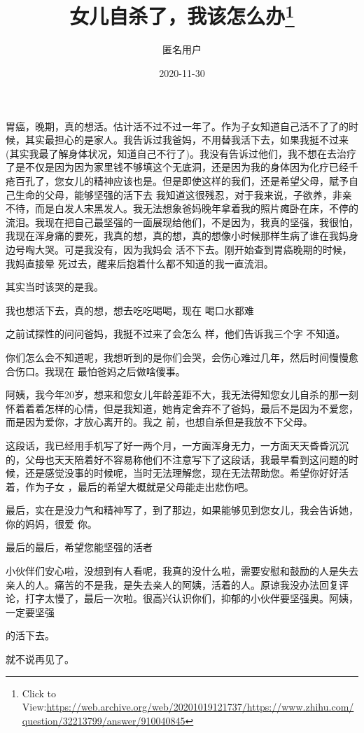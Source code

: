 \documentclass{article}
\title{女儿自杀了，我该怎么办\footnote{Click to View:\url{https://web.archive.org/web/20201019121737/https://www.zhihu.com/question/32213799/answer/910040845}}}
\author{匿名用户}
\date{2020-11-30}
\begin{document}

\maketitle


\Large

﻿胃癌，晚期，真的想活。估计活不过不过一年了。作为子女知道自己活不了了的时候，其实最担心的是家人。我告诉过我爸妈，不用替我活下去，如果我挺不过来(其实我最了解身体状况，知道自己不行了)。我没有告诉过他们，我不想在去治疗了是不仅是因为因为家里钱不够填这个无底洞，还是因为我的身体因为化疗已经千疮百孔了，您女儿的精神应该也是。但是即使这样的我们，还是希望父母，赋予自己生命的父母，能够坚强的活下去 我知道这很残忍，对于我来说，子欲养，非亲不待，而是白发人宋黑发人。我无法想象爸妈晚年拿着我的照片瘫卧在床，不停的流泪。我现在把自己最坚强的一面展现给他们，不是因为，我真的坚强，我很怕，我现在浑身痛的要死，我真的想，真的想，真的想像小时候那样生病了谁在我妈身边号啕大哭。可是我没有，因为我妈会
\newpage
活不下去。刚开始查到胃癌晚期的时候，我妈直接晕
死过去，醒来后抱着什么都不知道的我一直流泪。 


其实当时该哭的是我。 

我也想活下去，真的想，想去吃吃喝喝，现在
喝口水都难 

之前试探性的问问爸妈，我挺不过来了会怎么
样，他们告诉我三个字 不知道。 

你们怎么会不知道呢，我想听到的是你们会哭，会伤心难过几年，然后时间慢慢愈合伤口。我现在
最怕爸妈之后做啥傻事。 

阿姨，我今年20岁，想来和您女儿年龄差距不大，我无法得知您女儿自杀的那一刻怀着着着怎样的心情，但是我知道，她肯定舍弃不了爸妈，最后不是因为不爱您，而是因为爱你，才放心离开的。我之
前，也想自杀但是我放不下父母。 

\newpage

这段话，我已经用手机写了好一两个月，一方面浑身无力，一方面天天昏昏沉沉的，父母也天天陪着好不容易称他们不注意写下了这段话，我最早看到这问题的时候，还是感觉没事的时候呢，当时无法理解您，现在无法帮助您。希望你好好活着，作为子女
，最后的希望大概就是父母能走出悲伤吧。 

最后，实在是没力气和精神写了，到了那边，如果能够见到您女儿，我会告诉她，你的妈妈，很爱
你。 


最后的最后，希望您能坚强的活者 


 

小伙伴们安心啦，没想到有人看呢，我真的没什么啦，需要安慰和鼓励的人是失去亲人的人。痛苦的不是我，是失去亲人的阿姨，活着的人。原谅我没办法回复评论，打字太慢了，最后一次啦。很高兴认识你们，抑郁的小伙伴要坚强奥。阿姨，一定要坚强

\newpage
的活下去。 

就不说再见了。
\end{document}
